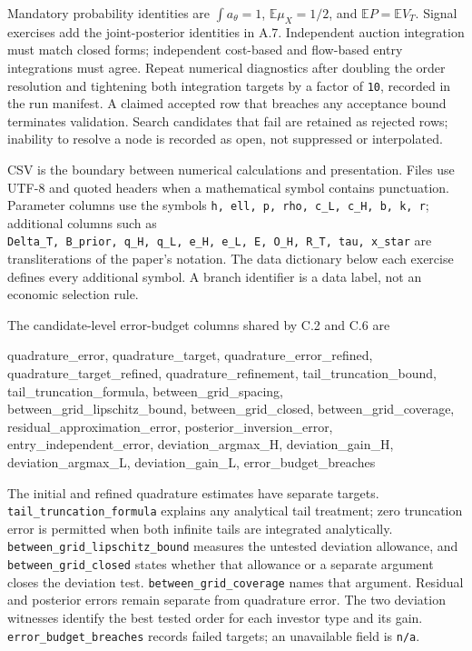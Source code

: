 \documentclass[
  11pt,
]{article}
\newenvironment{Shaded}{}{}
\newcommand{\NormalTok}[1]{#1}
\begin{document}
Mandatory probability identities are \(\int a_\theta=1\),
\(\mathbb E\mu_X=1/2\), and \(\mathbb E P=\mathbb E V_T\). Signal
exercises add the joint-posterior identities in A.7. Independent auction
integration must match closed forms; independent cost-based and
flow-based entry integrations must agree. Repeat numerical diagnostics
after doubling the order resolution and tightening both integration
targets by a factor of \texttt{10}, recorded in the run manifest. A
claimed accepted row that breaches any acceptance bound terminates
validation. Search candidates that fail are retained as rejected rows;
inability to resolve a node is recorded as open, not suppressed or
interpolated.

CSV is the boundary between numerical calculations and presentation.
Files use UTF-8 and quoted headers when a mathematical symbol contains
punctuation. Parameter columns use the symbols
\texttt{h,\ ell,\ p,\ rho,\ c\_L,\ c\_H,\ b,\ k,\ r}; additional columns
such as
\texttt{Delta\_T,\ B\_prior,\ q\_H,\ q\_L,\ e\_H,\ e\_L,\ E,\ O\_H,\ R\_T,\ tau,\ x\_star}
are transliterations of the paper's notation. The data dictionary below
each exercise defines every additional symbol. A branch identifier is a
data label, not an economic selection rule.

The candidate-level error-budget columns shared by C.2 and C.6 are

\begin{Shaded}
\begin{Highlighting}[]
\NormalTok{quadrature\_error, quadrature\_target, quadrature\_error\_refined,}
\NormalTok{quadrature\_target\_refined, quadrature\_refinement, tail\_truncation\_bound,}
\NormalTok{tail\_truncation\_formula, between\_grid\_spacing, between\_grid\_lipschitz\_bound,}
\NormalTok{between\_grid\_closed, between\_grid\_coverage, residual\_approximation\_error,}
\NormalTok{posterior\_inversion\_error, entry\_independent\_error, deviation\_argmax\_H,}
\NormalTok{deviation\_gain\_H, deviation\_argmax\_L, deviation\_gain\_L, error\_budget\_breaches}
\end{Highlighting}
\end{Shaded}

The initial and refined quadrature estimates have separate targets.
\texttt{tail\_truncation\_formula} explains any analytical tail
treatment; zero truncation error is permitted when both infinite tails
are integrated analytically. \texttt{between\_grid\_lipschitz\_bound}
measures the untested deviation allowance, and
\texttt{between\_grid\_closed} states whether that allowance or a
separate argument closes the deviation test.
\texttt{between\_grid\_coverage} names that argument. Residual and
posterior errors remain separate from quadrature error. The two
deviation witnesses identify the best tested order for each investor
type and its gain. \texttt{error\_budget\_breaches} records failed
targets; an unavailable field is \texttt{n/a}.
\end{document}
